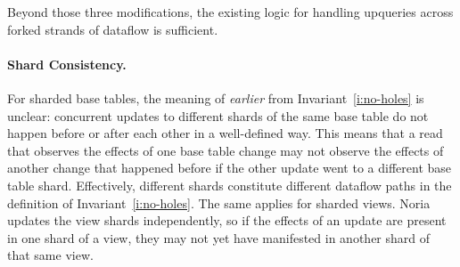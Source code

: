 Beyond those three modifications, the existing logic for handling upqueries
across forked strands of dataflow is sufficient.

\paragraph{Shard Consistency.}
For sharded base tables, the meaning of \emph{earlier} from
Invariant~\ref{i:no-holes} is unclear: concurrent updates to different shards of
the same base table do not happen before or after each other in a well-defined
way. This means that a read that observes the effects of one base table change
may not observe the effects of another change that happened before if the other
update went to a different base table shard. Effectively, different shards
constitute different dataflow paths in the definition of
Invariant~\ref{i:no-holes}. The same applies for sharded views. Noria updates
the view shards independently, so if the effects of an update are present in one
shard of a view, they may not yet have manifested in another shard of that same
view.



